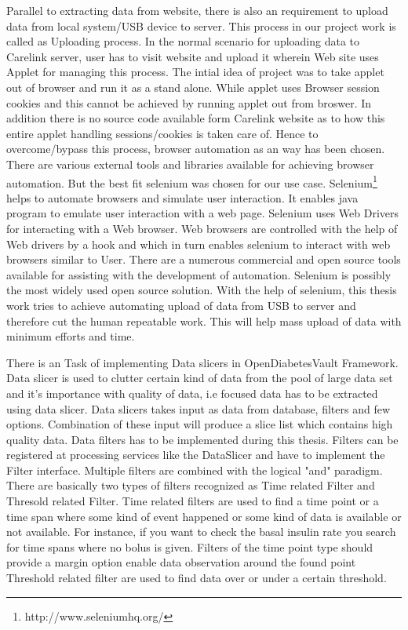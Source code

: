 \documentclass[article,type=msc,colorback,accentcolor=tud9c,twoside,11pt]{tudthesis}
\begin{document}
Parallel to extracting data from website, there is also an requirement to upload data from local system/USB device to server. This process in our project work is called as Uploading process. In the normal scenario for uploading data to Carelink server, user has to visit website and upload it wherein Web site uses Applet for managing this process. The intial idea of project was to take applet out of browser and run it as a stand alone. While applet uses Browser session cookies and this cannot be achieved by running applet out from broswer. In addition there is no source code available form Carelink website as to how this entire applet handling sessions/cookies is taken care of. Hence to overcome/bypass this process, browser automation as an way has been chosen. There are various external tools and libraries available for achieving browser automation. But the best fit selenium  was chosen for our use case. Selenium\footnote{http://www.seleniumhq.org/} helps to automate browsers and simulate user interaction. It enables java program to emulate user interaction with a web page. Selenium\cite{Webdriver} uses Web Drivers for interacting with a Web browser. Web browsers are controlled with the help of Web drivers by a hook and which in turn enables selenium to interact with web browsers similar to User. There are a numerous commercial and open source tools available for assisting with the development of automation. Selenium is possibly the most widely used open source solution. With the help of selenium, this thesis work tries to achieve automating upload of data from USB to server and therefore cut the human repeatable work. This will help mass upload of data with minimum efforts and time.

There is an Task of implementing Data slicers in OpenDiabetesVault Framework. Data slicer is used to clutter certain kind of data from the pool of large data set and  it's importance with quality of data, i.e focused data has to be extracted using data slicer. Data slicers takes input as data from database, filters and few options. Combination of these input will produce a slice list which contains high quality data. Data filters has to be implemented during this thesis. Filters can be registered at processing services like the DataSlicer and have to implement the Filter interface. Multiple filters are combined with the logical "and" paradigm. There are basically two types of filters recognized as Time related Filter and Thresold related Filter. Time related filters  are used to find a time point or a time span where some kind of event happened or some kind of data is available or not available. For instance, if you want to check the basal insulin rate you search for time spans where no bolus is given. Filters of the time point type should provide a margin option enable data observation around the found point Threshold related filter are used to find data over or under a certain threshold.
\end{document}
